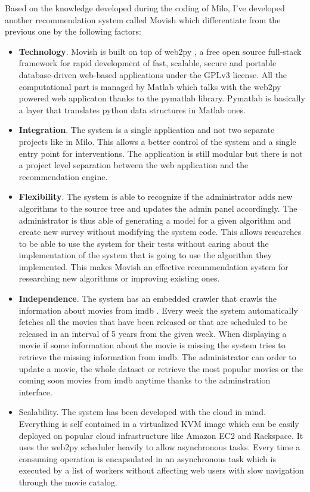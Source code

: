Based on the knowledge developed during the coding of Milo, I've developed another recommendation system called Movish which differentiate from the previous one by the following factors:
\begin{itemize}
\item \textbf{Technology}. Movish is built on top of web2py \cite{web2py}, a free open source full-stack framework for rapid development of fast, scalable, secure and portable database-driven web-based applications under the GPLv3\cite{gplv3} license. All the computational part is managed by Matlab \cite{matlab} which talks with the web2py powered web applicaton thanks to the pymatlab \cite{pymatlab} library. Pymatlab is basically a layer that translates python data structures in Matlab ones. 
\item \textbf{Integration}. The system is a single application and not two separate projects like in Milo. This allows a better control of the system and a single entry point for interventions. The application is still modular but there is not a project level separation between the web application and the recommendation engine.
\item \textbf{Flexibility}. The system is able to recognize if the administrator adds new algorithms to the source tree and updates the admin panel accordingly. The administrator is thus able of generating a model for a given algorithm and create new survey without modifying the system code. This allows researches to be able to use the system for their tests without caring about the implementation of the system that is going to use the algorithm they implemented. This makes Movish an effective recommendation system for researching new algorithms or improving existing ones. 
\item \textbf{Independence}. The system has an embedded crawler that crawls the information about movies from imdb \cite{imdb}. Every week the system automatically fetches all the movies that have been released or that are scheduled to be released in an interval of 5 years from the given week. When displaying a movie if some information about the movie is missing the system tries to retrieve the missing information from imdb. The administrator can order to update a movie, the whole dataset or retrieve the most popular movies or the coming soon movies from imdb anytime thanks to the adminstration interface.
\item Scalability. The system has been developed with the cloud in mind. Everything is self contained in a virtualized KVM image which can be easily deployed on popular cloud infrastructure like Amazon EC2 and Rackspace. It uses the web2py scheduler heavily to allow asynchronous tasks. Every time a consuming operation is encapsulated in an asynchronous task which is executed by a list of workers without affecting web users with slow navigation through the movie catalog. 
\end{itemize}

